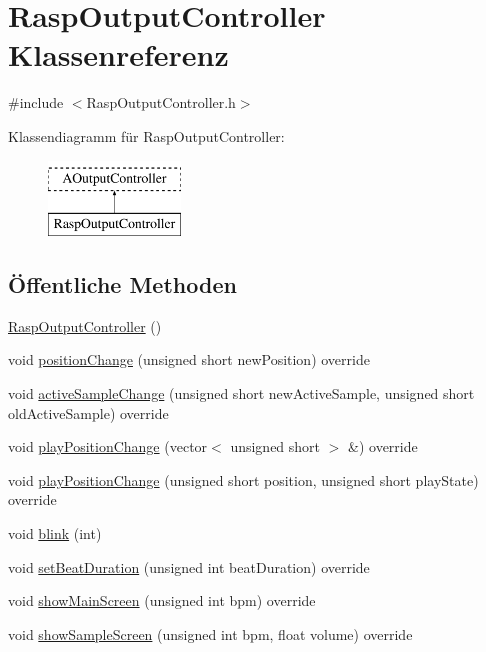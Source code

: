 \hypertarget{class_rasp_output_controller}{}\section{Rasp\+Output\+Controller Klassenreferenz}
\label{class_rasp_output_controller}


{\ttfamily \#include $<$Rasp\+Output\+Controller.\+h$>$}

Klassendiagramm für Rasp\+Output\+Controller\+:\begin{figure}[H]
\begin{center}
\leavevmode
\includegraphics[height=2.000000cm]{class_rasp_output_controller}
\end{center}
\end{figure}
\subsection*{Öffentliche Methoden}
\begin{DoxyCompactItemize}
\item 
\hyperlink{class_rasp_output_controller_afd7487de7ff81c6b092f4072d4fa80a5}{Rasp\+Output\+Controller} ()
\item 
void \hyperlink{class_rasp_output_controller_afce87d510c0564567e4250b22639d5e0}{position\+Change} (unsigned short new\+Position) override
\item 
void \hyperlink{class_rasp_output_controller_a92954cf26d4dd5f7d8835d1d508302c0}{active\+Sample\+Change} (unsigned short new\+Active\+Sample, unsigned short old\+Active\+Sample) override
\item 
void \hyperlink{class_rasp_output_controller_aa084e570bcf25c75b9389ca63c875f0c}{play\+Position\+Change} (vector$<$ unsigned short $>$ \&) override
\item 
void \hyperlink{class_rasp_output_controller_a0778395ee8ec044d04fbfcb2f3b2eb04}{play\+Position\+Change} (unsigned short position, unsigned short play\+State) override
\item 
void \hyperlink{class_rasp_output_controller_a27fcbf9e1a1f9c3cefefefd537acc401}{blink} (int)
\item 
void \hyperlink{class_rasp_output_controller_a5fd551f1aba056356befd71e5bff23f1}{set\+Beat\+Duration} (unsigned int beat\+Duration) override
\item 
void \hyperlink{class_rasp_output_controller_ad195a3d664b7c7e5680cd8949203c1fc}{show\+Main\+Screen} (unsigned int bpm) override
\item 
void \hyperlink{class_rasp_output_controller_a613d3a1d1ceb31875be95e4a4b733fba}{show\+Sample\+Screen} (unsigned int bpm, float volume) override
\end{DoxyCompactItemize}
